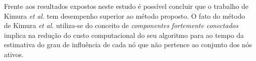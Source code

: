 \documentclass{acm_proc_article-sp}
\begin{document}
Frente aos resultados expostos neste estudo é possível concluir que o trabalho de Kimura \textit{et al.} tem
desempenho superior ao método proposto. O fato do  método de Kimura \textit{et al.} utiliza-se do conceito de
\textit{componentes fortemente conectados} implica na redução do custo computacional do seu algoritmo para ao
tempo da estimativa do grau de influência de cada nó que não pertence ao conjunto dos nós ativos.



 
\end{document}
